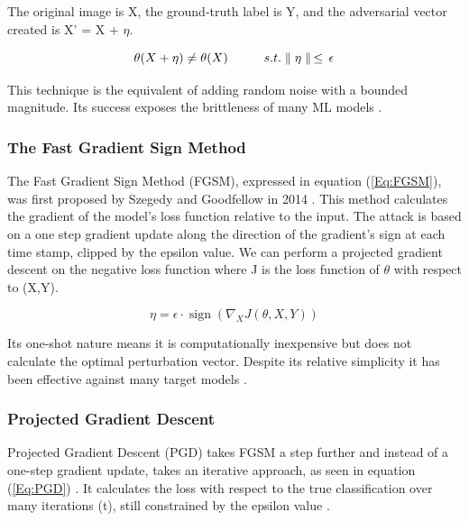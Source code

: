 \documentclass{article}
\DeclareMathOperator{\sign}{sign}
\begin{document}
The original image is X, the ground-truth label is Y, and the adversarial vector created is X' = X + $\eta$.  

\begin{equation}\label{Eq:UAP}
\theta(X + \eta) \ne \theta(X) \hspace{0.5cm}  \hspace{0.5cm} s.t. \parallel \eta \parallel \, \leq \, \epsilon 
\end{equation} 

This technique is the equivalent of adding random noise with a bounded magnitude. Its success exposes the brittleness of many ML models \cite{moosavi-dezfooli_universal_2017,biggio_wild_2018}. 

\subsubsection{The Fast Gradient Sign Method}

The Fast Gradient Sign Method (FGSM), expressed in equation (\ref{Eq:FGSM}), was first proposed by Szegedy and Goodfellow in 2014 \cite{szegedy_intriguing_2014}. This method calculates the gradient of the model's loss function relative to the input. The attack is based on a one step gradient update along the direction of the gradient's sign at each time stamp, clipped by the epsilon value. We can perform a projected gradient descent on the negative loss function where J is the loss function of $\theta$ with respect to (X,Y).    


\begin{equation}\label{Eq:FGSM}
\eta = \epsilon \cdot \sign (\nabla_{X}J(\theta,X, Y))
\end{equation}

Its one-shot nature means it is computationally inexpensive but does not calculate the optimal perturbation vector. Despite its relative simplicity it has been effective against many target models \cite{biggio_wild_2018}.

\subsubsection{Projected Gradient Descent}

Projected Gradient Descent (PGD) takes FGSM a step further and instead of a one-step gradient update, takes an iterative approach, as seen in equation (\ref{Eq:PGD}) \cite{biggio_wild_2018}. It calculates the loss with respect to the true classification over many iterations (t), still constrained by the epsilon value \cite{biggio_evasion_2013}.   
\end{document}
